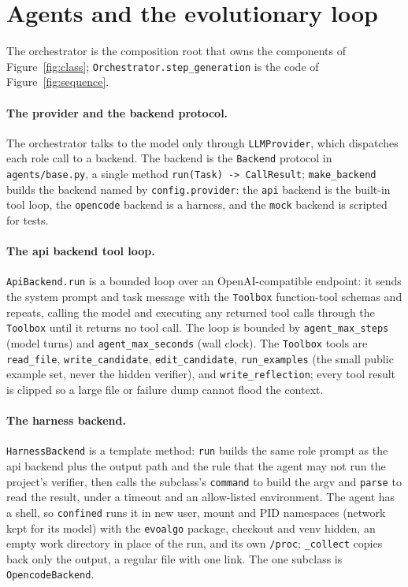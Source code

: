 \section{Agents and the evolutionary loop}
\label{sec:impl-agents}

The orchestrator is the composition root that owns the components of
Figure~\ref{fig:class}; \texttt{Orchestrator.step\_generation} is the code of
Figure~\ref{fig:sequence}.

\paragraph{The provider and the backend protocol.} The orchestrator talks to
the model only through \texttt{LLMProvider}, which dispatches each role call to a
backend. The backend is the \texttt{Backend} protocol in \texttt{agents/base.py},
a single method \texttt{run(Task) -> CallResult}; \texttt{make\_backend} builds
the backend named by \texttt{config.provider}: the \texttt{api} backend is the
built-in tool loop, the \texttt{opencode} backend is a harness, and the \texttt{mock} backend is scripted for tests.

\paragraph{The api backend tool loop.} \texttt{ApiBackend.run} is a bounded
loop over an OpenAI-compatible endpoint: it sends the system prompt and task
message with the \texttt{Toolbox} function-tool schemas and repeats, calling
the model and executing any returned tool calls through the \texttt{Toolbox}
until it returns no tool call. The loop is bounded by \texttt{agent\_max\_steps}
(model turns) and \texttt{agent\_max\_seconds} (wall clock). The \texttt{Toolbox}
tools are \texttt{read\_file}, \texttt{write\_candidate}, \texttt{edit\_candidate},
\texttt{run\_examples} (the small public example set, never the hidden verifier),
and \texttt{write\_reflection}; every tool result is clipped so a large file or
failure dump cannot flood the context.

\paragraph{The harness backend.} \texttt{HarnessBackend} is a template method:
\texttt{run} builds the same role prompt as the api backend plus the output path
and the rule that the agent may not run the project's verifier, then calls the
subclass's \texttt{command} to build the argv and \texttt{parse} to read the
result, under a timeout and an allow-listed environment. The agent has a shell,
so \texttt{confined} runs it in new user, mount and PID namespaces (network kept
for its model) with the \texttt{evoalgo} package, checkout and venv hidden, an
empty work directory in place of the run, and its own \texttt{/proc};
\texttt{\_collect} copies back only the output, a regular file with one link.
The one subclass is \texttt{OpencodeBackend}.

